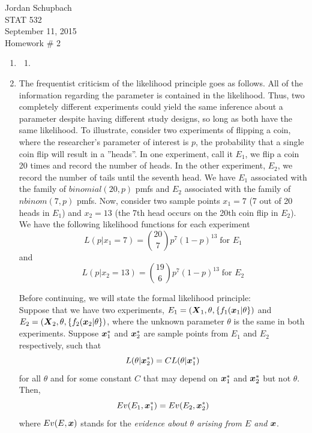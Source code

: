 \documentclass[12pt]{article}\usepackage[]{graphicx}\usepackage[]{color}
\newcommand{\bfX}{\mbox{\boldmath $X$}}
\newcommand{\bfx}{\mbox{\boldmath $x$}}
\begin{document}
{ \flushright Jordan Schupbach \\
STAT 532\\
September 11, 2015 \\}
Homework \# 2\\

\begin{enumerate}
\item 
\begin{enumerate}[label=(\alph*)]
\item
\end{enumerate}
\item The frequentist criticism of the likelihood principle goes as follows. All of the information regarding the parameter is contained in the likelihood. Thus, two completely different experiments could yield the same inference about a parameter despite having different study designs, so long as both have the same likelihood. To illustrate, consider two experiments of flipping a coin, where the researcher's parameter of interest is $p$, the probability that a single coin flip will result in a ''heads''. In one experiment, call it $E_1$, we flip a coin 20 times and record the number of heads. In the other experiment, $E_2$, we record the number of tails until the seventh head. We have $E_1$ associated with the family of $binomial(20,p)$ pmfs and $E_2$ associated with the family of $nbinom(7,p)$ pmfs. Now, consider two sample points $x_1 = 7$ (7 out of 20 heads in $E_1$) and $x_2 = 13$ (the 7th head occurs on the 20th coin flip in $E_2$). We have the following likelihood functions for each experiment
$$L(p|x_1=7) = {20 \choose 7} p^7 (1-p)^{13} \; \text{for } E_1$$
and
$$L(p|x_2=13) = {19 \choose 6} p^7 (1-p)^{13} \; \text{for } E_2$$

Before continuing, we will state the formal likelihood principle:\\

Suppose that we have two experiments, $E_1 = ( \bfX_1, \theta, \{ f_1( \bfx_1 | \theta \})$ and  $E_2 = ( \bfX_2, \theta, \{ f_2( \bfx_2 | \theta \})$, where the unknown parameter $\theta$ is the same in both experiments. Suppose $\bfx_1^*$ and $\bfx_2^*$ are sample points from $E_1$ and $E_2$ respectively, such that
$$L(\theta | \bfx_2^*) = C L(\theta | \bfx_1^*)$$
for all $\theta$ and for some constant $C$ that may depend on $\bfx_1^*$ and $\bfx_2^*$ but not $\theta$.
Then,
\[Ev(E_1, \bfx_1^*) = Ev(E_2, \bfx_2^*)\]
where $Ev(E, \bfx)$ stands for the \emph{evidence about $\theta$ arising from $E$ and $\bfx$}.\\


\end{enumerate}
\end{document}
